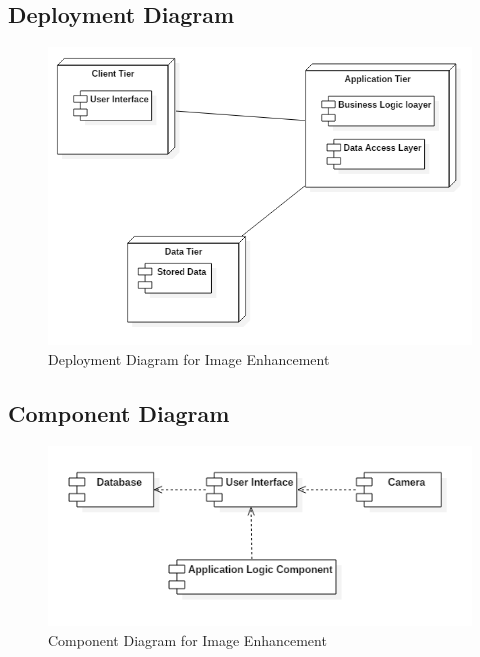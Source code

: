 \subsection{Deployment Diagram}

\begin{figure}[!htb]
	\centering
	\includegraphics[scale=0.8]{images/ch4/deployment.png}
	\caption{Deployment Diagram for Image Enhancement}
	\label{fig:deployment}
\end{figure}


\subsection{Component Diagram}

\begin{figure}[!htb]
	\centering
	\includegraphics[scale=0.8]{images/ch4/component.png}
	\caption{Component Diagram for Image Enhancement}
	\label{fig:component}
\end{figure}

